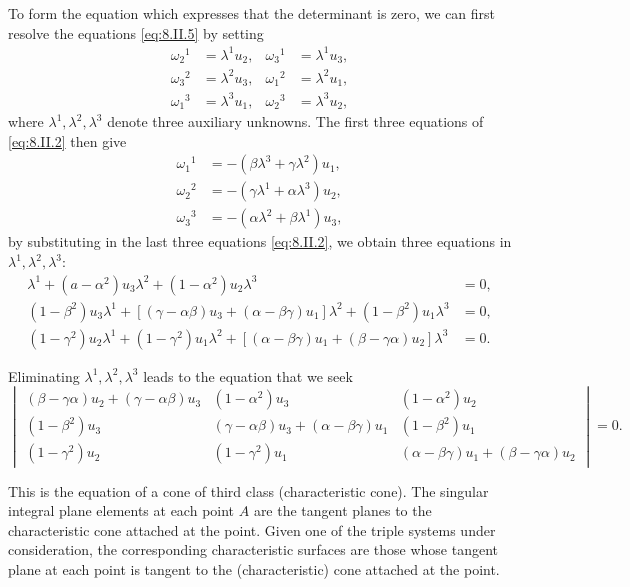 \documentclass[leqno,11pt]{book}
\numberwithin{equation}{chapter}
\theoremstyle{shape1}
\theoremstyle{shape0}
\theoremstyle{shape2}
\theoremstyle{definition}
\begin{document}
To form the equation which expresses that the determinant is zero, we can first resolve the equations \eqref{eq:8.II.5} by setting
\begin{align*}
  \omega_{2}{}^{1}&=\lambda^{1}u_{2},&\omega_{3}{}^{1}&=\lambda^{1}u_{3},\\
  \omega_{3}{}^{2}&=\lambda^{2}u_{3},&\omega_{1}{}^{2}&=\lambda^{2}u_{1},\\
  \omega_{1}{}^{3}&=\lambda^{3}u_{1},&\omega_{2}{}^{3}&=\lambda^{3}u_{2},
\end{align*}
where $\lambda^{1},\lambda^{2},\lambda^{3}$ denote three auxiliary unknowns. The first three equations of \eqref{eq:8.II.2} then give
\begin{align*}
  \omega_{1}{}^{1}&=-(\beta\lambda^{3}+\gamma\lambda^{2})u_{1},\\
  \omega_{2}{}^{2}&=-(\gamma\lambda^{1}+\alpha\lambda^{3})u_{2},\\
  \omega_{3}{}^{3}&=-(\alpha\lambda^{2}+\beta\lambda^{1})u_{3},
\end{align*}
by substituting in the last three equations \eqref{eq:8.II.2}, we obtain three equations in $\lambda^{1},\lambda^{2},\lambda^{3}$:
\begin{align*}
  [(\beta-\alpha\gamma)u_{2}+(\gamma-\alpha\beta)u_{3}]\lambda^{1}+(a-\alpha^{2})u_{3}\lambda^{2}+(1-\alpha^{2})u_{2}\lambda^{3}&=0,\\
  (1-\beta^{2})u_{3}\lambda^{1}+[(\gamma-\alpha\beta)u_{3}+(\alpha-\beta\gamma)u_{1}]\lambda^{2}+(1-\beta^{2})u_{1}\lambda^{3}&=0,\\
  (1-\gamma^{2})u_{2}\lambda^{1}+(1-\gamma^{2})u_{1}\lambda^{2}+[(\alpha-\beta\gamma)u_{1}+(\beta-\gamma\alpha)u_{2}]\lambda^{3}&=0.
\end{align*}

Eliminating $\lambda^{1},\lambda^{2},\lambda^{3}$ leads to the equation that we seek
\begin{equation}
  \label{eq:8.II.6}\tag{II, 6}
  \begin{vmatrix}
    (\beta-\gamma\alpha)u_{2}+(\gamma-\alpha\beta)u_{3}&(1-\alpha^{2})u_{3}&(1-\alpha^{2})u_{2}\\
    (1-\beta^{2})u_{3}&(\gamma-\alpha\beta)u_{3}+(\alpha-\beta\gamma)u_{1}&(1-\beta^{2})u_{1}\\
    (1-\gamma^{2})u_{2}&(1-\gamma^{2})u_{1}&(\alpha-\beta\gamma)u_{1}+(\beta-\gamma\alpha)u_{2}
  \end{vmatrix}=0.
\end{equation}

This is the equation of a cone of third class (characteristic cone). The singular integral plane elements at each point $A$ are the tangent planes to the characteristic cone attached at the point. Given one of the triple systems under consideration, the corresponding characteristic surfaces are those whose tangent plane at each point is tangent to the (characteristic) cone attached at the point.
\end{document}
